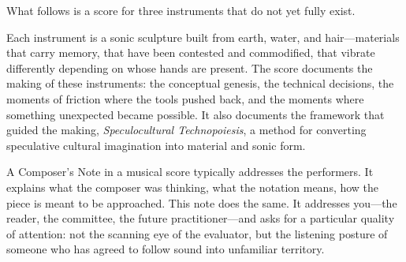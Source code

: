 
What follows is a score for three instruments that do not yet fully exist.

Each instrument is a sonic sculpture built from earth, water, and hair---materials that carry memory, that have been contested and commodified, that vibrate differently depending on whose hands are present. The score documents the making of these instruments: the conceptual genesis, the technical decisions, the moments of friction where the tools pushed back, and the moments where something unexpected became possible. It also documents the framework that guided the making, \textit{Speculocultural Technopoiesis}, a method for converting speculative cultural imagination into material and sonic form.

A Composer's Note in a musical score typically addresses the performers. It explains what the composer was thinking, what the notation means, how the piece is meant to be approached. This note does the same. It addresses you---the reader, the committee, the future practitioner---and asks for a particular quality of attention: not the scanning eye of the evaluator, but the listening posture of someone who has agreed to follow sound into unfamiliar territory.

